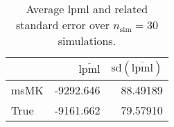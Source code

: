 \begin{table}[H]

\caption{Average lpml and related standard error over $n_{\text{sim}} = 30$ simulations.}
\centering
\begin{tabular}[t]{lrr}
\toprule
  & $\overbar{\text{lpml}}$ & $\text{sd}(\overbar{\text{lpml}})$\\
\midrule
msMK & -9292.646 & 88.49189\\
True & -9161.662 & 79.57910\\
\bottomrule
\end{tabular}
\end{table}